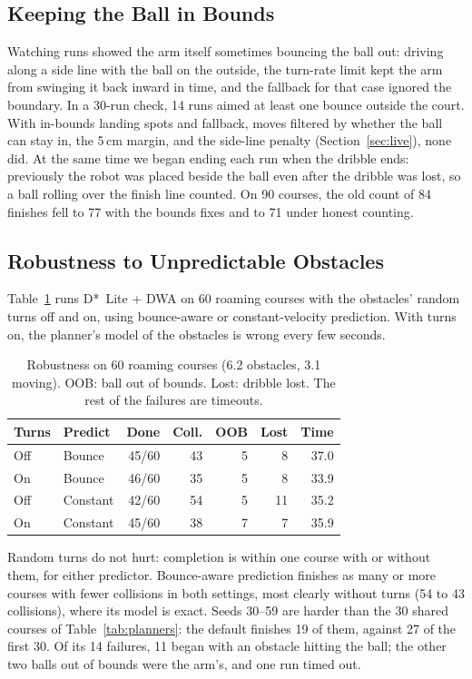 \documentclass[10pt,twocolumn]{article}
\begin{document}
\subsection{Keeping the Ball in Bounds}
Watching runs showed the arm itself sometimes bouncing the ball out: driving
along a side line with the ball on the outside, the turn-rate limit kept
the arm from swinging it back inward in time, and the fallback for that
case ignored the boundary. In a 30-run check, 14 runs aimed at least one
bounce outside the court. With in-bounds landing spots and fallback, moves
filtered by whether the ball can stay in, the 5\,cm margin, and the
side-line penalty (Section~\ref{sec:live}), none did. At the same time we
began ending each run when the dribble ends: previously the robot was
placed beside the ball even after the dribble was lost, so a ball rolling
over the finish line counted. On 90 courses, the old count of 84 finishes
fell to 77 with the bounds fixes and to 71 under honest counting.

\subsection{Robustness to Unpredictable Obstacles}
Table~\ref{tab:robust} runs D*~Lite + DWA on 60 roaming courses with the
obstacles' random turns off and on, using bounce-aware or constant-velocity
prediction. With turns on, the planner's model of the obstacles is wrong
every few seconds.

\begin{table}[h]
\centering
\small
\setlength{\tabcolsep}{2.5pt}
\begin{tabular}{@{}llrrrrr@{}}
\toprule
\textbf{Turns} & \textbf{Predict} & \textbf{Done} & \textbf{Coll.} & \textbf{OOB} & \textbf{Lost} & \textbf{Time} \\
\midrule
Off & Bounce   & 45/60 & 43 & 5 & 8  & 37.0 \\
On  & Bounce   & 46/60 & 35 & 5 & 8  & 33.9 \\
Off & Constant & 42/60 & 54 & 5 & 11 & 35.2 \\
On  & Constant & 45/60 & 38 & 7 & 7  & 35.9 \\
\bottomrule
\end{tabular}
\caption{Robustness on 60 roaming courses (6.2 obstacles, 3.1 moving).
OOB: ball out of bounds. Lost: dribble lost. The rest of the failures are
timeouts.}
\label{tab:robust}
\end{table}

Random turns do not hurt: completion is within one course with or without
them, for either predictor. Bounce-aware prediction finishes as many or
more courses with fewer collisions in both settings, most clearly without
turns (54 to 43 collisions), where its model is exact. Seeds 30--59 are
harder than the 30 shared courses of Table~\ref{tab:planners}: the default
finishes 19 of them, against 27 of the first 30. Of its 14 failures, 11
began with an obstacle hitting the ball; the other two balls out of bounds
were the arm's, and one run timed out.
\end{document}
